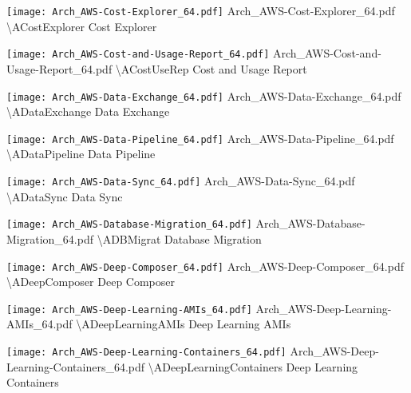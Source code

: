  {\texttt{[image: Arch\_AWS-Cost-Explorer\_64.pdf]}} {Arch\_AWS-Cost-Explorer\_64.pdf} {{\textbackslash}ACostExplorer} {Cost Explorer}

 {\texttt{[image: Arch\_AWS-Cost-and-Usage-Report\_64.pdf]}} {Arch\_AWS-Cost-and-Usage-Report\_64.pdf} {{\textbackslash}ACostUseRep} {Cost and Usage Report}

 {\texttt{[image: Arch\_AWS-Data-Exchange\_64.pdf]}} {Arch\_AWS-Data-Exchange\_64.pdf} {{\textbackslash}ADataExchange} {Data Exchange}

 {\texttt{[image: Arch\_AWS-Data-Pipeline\_64.pdf]}} {Arch\_AWS-Data-Pipeline\_64.pdf} {{\textbackslash}ADataPipeline} {Data Pipeline}

 {\texttt{[image: Arch\_AWS-Data-Sync\_64.pdf]}} {Arch\_AWS-Data-Sync\_64.pdf} {{\textbackslash}ADataSync} {Data Sync}

 {\texttt{[image: Arch\_AWS-Database-Migration\_64.pdf]}} {Arch\_AWS-Database-Migration\_64.pdf} {{\textbackslash}ADBMigrat} {Database Migration}

 {\texttt{[image: Arch\_AWS-Deep-Composer\_64.pdf]}} {Arch\_AWS-Deep-Composer\_64.pdf} {{\textbackslash}ADeepComposer} {Deep Composer}

 {\texttt{[image: Arch\_AWS-Deep-Learning-AMIs\_64.pdf]}} {Arch\_AWS-Deep-Learning-AMIs\_64.pdf} {{\textbackslash}ADeepLearningAMIs} {Deep Learning AMIs}

 {\texttt{[image: Arch\_AWS-Deep-Learning-Containers\_64.pdf]}} {Arch\_AWS-Deep-Learning-Containers\_64.pdf} {{\textbackslash}ADeepLearningContainers} {Deep Learning Containers}

